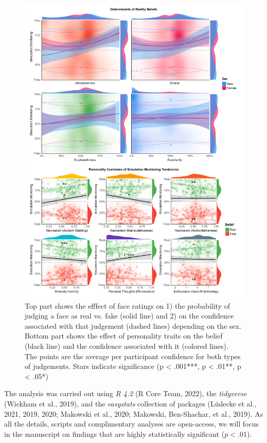 \documentclass[
  man,floatsintext]{apa6}
\begin{document}
\begin{figure}
\includegraphics[width=1\linewidth]{../figures/Figure2} \caption{Top part shows the efffect of face ratings on 1) the probability of judging a face as real vs. fake (solid line) and 2) on the confidence associated with that judgement (dashed lines) depending on the sex. Bottom part shows the effect of personality traits on the belief (black line) and the confidence associated with it (colored lines). The points are the average per participant confidence for both types of judgements. Stars indicate significance (p < .001***, p < .01**, p < .05*)}\label{fig:unnamed-chunk-3}
\end{figure}

The analysis was carried out using \emph{R 4.2} (R Core Team, 2022), the \emph{tidyverse} (Wickham et al., 2019), and the \emph{easystats} collection of packages (Lüdecke et al., 2021, 2019, 2020; Makowski et al., 2020; Makowski, Ben-Shachar, et al., 2019). As all the details, scripts and complimentary analyses are open-access, we will focus in the manuscript on findings that are highly statistically significant (\(p <.01\)).
\end{document}
